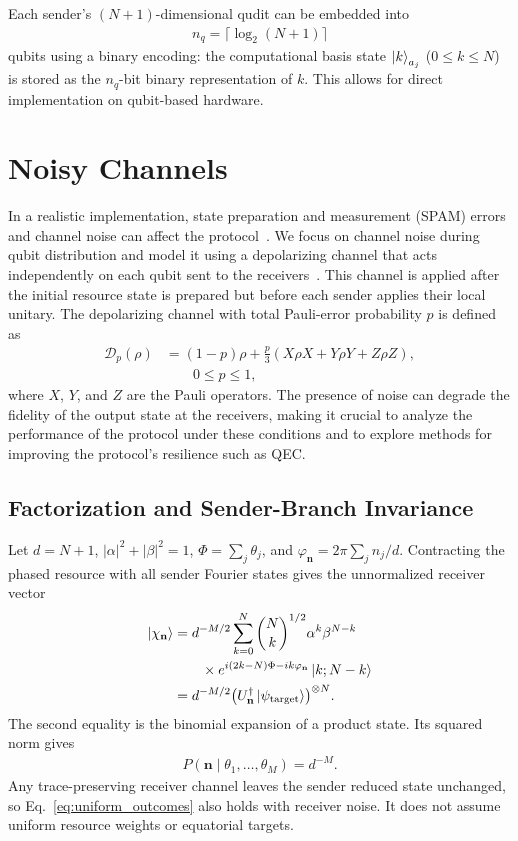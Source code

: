 \documentclass[aps,physrev,10pt,twocolumn,superscriptaddress,floatfix]{revtex4-2}
\begin{document}
Each sender's $(N{+}1)$-dimensional qudit can be embedded into
\begin{align}
n_q = \lceil \log_2(N+1) \rceil
\end{align}
qubits using a binary encoding: the computational basis state $\ket{k}_{a_j}$ ($0\le k\le N$) is stored as the $n_q$-bit binary representation of $k$. This allows for direct implementation on qubit-based hardware.

\section{Noisy Channels}

In a realistic implementation, state preparation and measurement (SPAM) errors and channel noise can affect the protocol~\cite{schumacher1996sending, bergou2021quantum}. We focus on channel noise during qubit distribution and model it using a depolarizing channel that acts independently on each qubit sent to the receivers~\cite{dur2005standard}. This channel is applied after the initial resource state is prepared but before each sender applies their local unitary. The depolarizing channel with total Pauli-error probability $p$ is defined as
\begin{align}
\mathcal{D}_p(\rho)
&= (1-p)\rho + \frac{p}{3}\left(X\rho X + Y\rho Y + Z\rho Z\right), \\
&\qquad 0\le p\le 1, \nonumber
\end{align}
where $X$, $Y$, and $Z$ are the Pauli operators. The presence of noise can degrade the fidelity of the output state at the receivers, making it crucial to analyze the performance of the protocol under these conditions and to explore methods for improving the protocol's resilience such as QEC.
%

\subsection{Factorization and Sender-Branch Invariance\label{sec:factorization}}
Let $d=N+1$, $|\alpha|^2+|\beta|^2=1$, $\Phi=\sum_j\theta_j$, and $\varphi_{\mathbf n}=2\pi\sum_jn_j/d$. Contracting the phased resource with all sender Fourier states gives the unnormalized receiver vector
\begin{align}
\ket{\chi_{\mathbf n}}
&=d^{-M/2}\sum_{k=0}^{N}\binom Nk^{1/2}\alpha^k\beta^{N-k}
 \nonumber\\
&\qquad\times e^{i(2k-N)\Phi-ik\varphi_{\mathbf n}}\ket{k;N-k}
 \nonumber\\
&=d^{-M/2}\bigl(U_{\mathbf n}^{\dagger}
 \ket{\psi_{\mathrm{target}}}\bigr)^{\otimes N}.
\label{eq:branch_vector}
\end{align}
The second equality is the binomial expansion of a product state. Its squared norm gives
\begin{align}
 P(\mathbf n\mid\theta_1,\ldots,\theta_M)=d^{-M}.
 \label{eq:uniform_outcomes}
\end{align}
Any trace-preserving receiver channel leaves the sender reduced state unchanged, so Eq.~\eqref{eq:uniform_outcomes} also holds with receiver noise. It does not assume uniform resource weights or equatorial targets.
\end{document}
